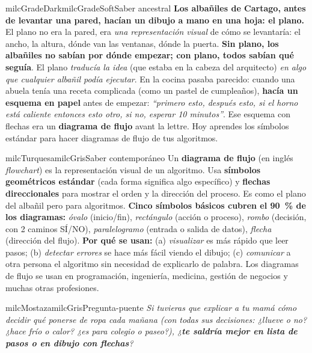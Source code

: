 \documentclass[11pt,letterpaper]{article}
\begin{document}
\begin{softbox}{milcGradeDark}{milcGradeSoft}{Saber ancestral}
\textbf{Los albañiles de Cartago, antes de levantar una pared, hacían un dibujo a mano en una hoja: el plano.} El plano no era la pared, era \emph{una representación visual} de cómo se levantaría: el ancho, la altura, dónde van las ventanas, dónde la puerta. \textbf{Sin plano, los albañiles no sabían por dónde empezar; con plano, todos sabían qué seguía}. El plano \emph{traducía la idea} (que estaba en la cabeza del arquitecto) \emph{en algo que cualquier albañil podía ejecutar}. En la cocina pasaba parecido: cuando una abuela tenía una receta complicada (como un pastel de cumpleaños), \textbf{hacía un esquema en papel} antes de empezar: \emph{``primero esto, después esto, si el horno está caliente entonces esto otro, si no, esperar 10 minutos''}. Ese esquema con flechas era un \textbf{diagrama de flujo} avant la lettre. Hoy aprendes los símbolos estándar para hacer diagramas de flujo de tus algoritmos.
\end{softbox}

\begin{softbox}{milcTurquesa}{milcGris}{Saber contemporáneo}
Un \textbf{diagrama de flujo} (en inglés \emph{flowchart}) es la representación visual de un algoritmo. Usa \textbf{símbolos geométricos estándar} (cada forma significa algo específico) y \textbf{flechas direccionales} para mostrar el orden y la dirección del proceso. Es como el plano del albañil pero para algoritmos. \textbf{Cinco símbolos básicos cubren el 90~\% de los diagramas:} \emph{óvalo} (inicio/fin), \emph{rectángulo} (acción o proceso), \emph{rombo} (decisión, con 2 caminos SÍ/NO), \emph{paralelogramo} (entrada o salida de datos), \emph{flecha} (dirección del flujo). \textbf{Por qué se usan:} (a) \emph{visualizar} es más rápido que leer pasos; (b) \emph{detectar errores} se hace más fácil viendo el dibujo; (c) \emph{comunicar} a otra persona el algoritmo sin necesidad de explicarlo de palabra. Los diagramas de flujo se usan en programación, ingeniería, medicina, gestión de negocios y muchas otras profesiones.
\end{softbox}

\begin{softbox}{milcMostaza}{milcGris}{Pregunta-puente}
\textit{Si tuvieras que explicar a tu mamá \emph{cómo decidir qué ponerse de ropa cada mañana} (con todas sus decisiones: ¿llueve o no? ¿hace frío o calor? ¿es para colegio o paseo?), ¿\textbf{te saldría mejor en lista de pasos o en dibujo con flechas}?}
\end{softbox}
\end{document}
